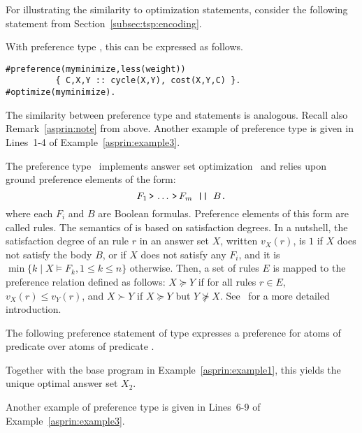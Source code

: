 For illustrating the similarity to optimization statements,
consider the following  statement from Section~\ref{subsec:tsp:encoding}.
%

%
With preference type ,
this can be expressed as follows.
\begin{lstlisting}[numbers=none]
#preference(myminimize,less(weight))
          { C,X,Y :: cycle(X,Y), cost(X,Y,C) }.
#optimize(myminimize).
\end{lstlisting}
The similarity between  preference type  and  statements is analogous.
Recall also Remark~\ref{asprin:note} from above.
%
Another example of preference type  is given in Lines~1-4 of Example~\ref{asprin:example3}.

The preference type~ implements answer set optimization~\cite{brnitr03a} and relies upon
ground preference elements of the form:
\[ F_1 \, \texttt{>} \, \dots \, \texttt{>} \, F_m \texttt{ || }B\texttt{.}\]
where each $F_i$ and $B$ are Boolean formulas.
Preference elements of this form are called  rules.  
The semantics of  is based on satisfaction degrees.
In a nutshell,
the satisfaction degree of an  rule $r$ in an answer set $X$, 
written $v_X(r)$, is 
$1$ if $X$ does not satisfy the body $B$, %
or  if $X$ does not satisfy any $F_i$, 
and it is $\min\{k \mid X \models F_k, 1\leq k\leq n\}$ otherwise.
Then, a set of  rules $E$ is mapped to the preference relation defined as follows:
$X \succeq Y$ if for all rules $r \in E$, $v_X(r) \leq v_Y(r)$, 
and $X \succ Y$ if $X \succeq Y$ but $Y \not\succeq X$. 
See~\cite{brnitr03a} for a more detailed introduction.

%
\begin{example}\label{asprin:asoexample}
%
%
The following preference statement of type  expresses a preference 
for atoms of predicate \code{a/1} over atoms of predicate \code{b/1}.
%

%
Together with the base program in Example~\ref{asprin:example1}, this yields the unique optimal answer set $X_2$.  
\end{example} %
Another example of preference type  is given in Lines~6-9 of Example~\ref{asprin:example3}.

